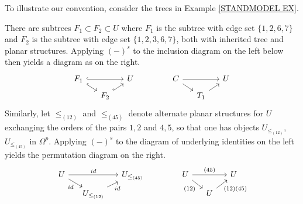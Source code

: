 \documentclass[a4paper,10pt]{article}%
\begin{document}
\begin{example}
To illustrate our convention, consider the trees in Example \ref{STANDMODEL EX}. 

There are subtrees
$F_1 \subset F_2 \subset U$
where $F_1$ is the subtree with edge set $\{1,2,6,7\}$ and 
$F_2$ is the subtree with edge set $\{1,2,3,6,7\}$, both with inherited tree and planar structures. 
Applying $(\minus)^s$ to the inclusion diagram on the left below then yields a diagram as on the right.
\[
\begin{tikzcd}[row sep = 0.5em,column sep =1.3em]
	F_1 \ar[hookrightarrow]{rr} \ar[hookrightarrow]{rd} & & U & &&
	C \ar{rr} \ar{rd} & & U
\\
	& F_2 \ar[hookrightarrow]{ru} & & &&
	& T_1 \ar{ru}
\end{tikzcd}
\]
Similarly, let $\leq_{(12)}$ and $\leq_{(45)}$ denote alternate planar structures for $U$ exchanging the orders of the pairs $1,2$ and $4,5$, so that one has objects 
$U_{\leq_{(12)}}$, $U_{\leq_{(45)}}$ in $\Omega^p$. 
Applying $(\minus)^s$ to the diagram of underlying identities on the left yields the permutation diagram on the right.
\[
\begin{tikzcd}[row sep = 0.5em,column sep =1.3em]
	U \ar{rr}{id} \ar{rd}[swap]{id} & & U_{\leq_{(45)}} & & &
	U \ar{rr}{(45)} \ar{rd}[swap]{(12)} & & U
\\
	& U_{\leq_{(12)}} \ar{ru}[swap]{id} & & & &
	& U \ar{ru}[swap]{(12)(45)}
\end{tikzcd}
\]
\end{example}
\end{document}
